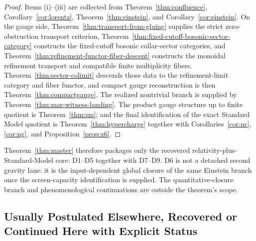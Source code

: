 \documentclass[11pt]{article}
\begin{document}
\begin{proof}
Items (i)--(iii) are collected from Theorem~\ref{thm:confluence}, Corollary~\ref{cor:lorentz}, Theorem~\ref{thm:einstein}, and Corollary~\ref{cor:einstein}. On the gauge side, Theorem~\ref{thm:transport-from-gluing} supplies the strict zero-obstruction transport criterion, Theorem~\ref{thm:fixed-cutoff-bosonic-sector-category} constructs the fixed-cutoff bosonic collar-sector categories, and Theorem~\ref{thm:refinement-functor-fiber-descent} constructs the monoidal refinement transport and compatible finite multiplicity fibers. Theorem~\ref{thm:sector-colimit} descends those data to the refinement-limit category and fiber functor, and compact gauge reconstruction is then Theorem~\ref{thm:compactgauge}. The realized nontrivial branch is supplied by Theorem~\ref{thm:mar-witness-landing}. The product gauge structure up to finite quotient is Theorem~\ref{thm:sm}; and the final identification of the exact Standard Model quotient is Theorem~\ref{thm:hypercharge} together with Corollaries~\ref{cor:nc}, \ref{cor:ng}, and Proposition~\ref{prop:z6}.
\end{proof}

Theorem~\ref{thm:master} therefore packages only the recovered relativity-plus-Standard-Model core: D1--D5 together with D7--D9. D6 is not a detached second gravity lane: it is the input-dependent global closure of the same Einstein branch once the screen-capacity identification is supplied. The quantitative-closure branch and phenomenological continuations are outside the theorem's scope.

\subsection*{Usually Postulated Elsewhere, Recovered or Continued Here with Explicit Status}
\end{document}
